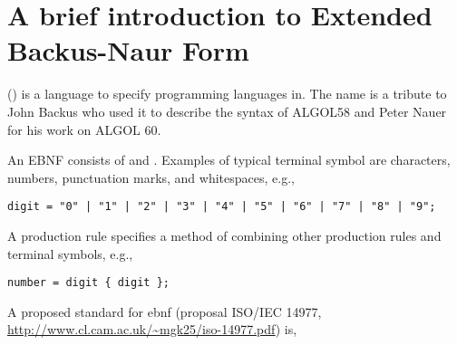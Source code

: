 \documentclass[fsharpnotes.tex]{subfiles}
\begin{document}
\chapter{A brief introduction to Extended Backus-Naur Form}
\label{sec:ebnf}
 () is a language to specify programming languages in. The name is a tribute to John Backus who used it to describe the syntax of ALGOL58 and Peter Nauer for his work on ALGOL 60.

An EBNF consists of  and . Examples of typical terminal symbol are characters, numbers, punctuation marks, and whitespaces, e.g.,
\begin{lstlisting}[language=ebnf]
digit = "0" | "1" | "2" | "3" | "4" | "5" | "6" | "7" | "8" | "9";
\end{lstlisting}
A production rule specifies a method of combining other production rules and terminal symbols, e.g.,
\begin{lstlisting}[language=ebnf]
number = digit { digit };
\end{lstlisting}
A proposed standard for ebnf (proposal ISO/IEC 14977, \url{http://www.cl.cam.ac.uk/~mgk25/iso-14977.pdf}) is,
\end{document}
